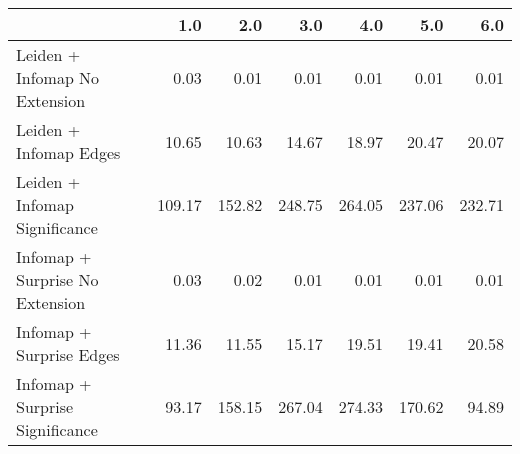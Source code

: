 \begin{tabular}{lrrrrrr}
\toprule
{} &    1.0 &    2.0 &    3.0 &    4.0 &    5.0 &    6.0 \\
\midrule
Leiden + Infomap No Extension   &   0.03 &   0.01 &   0.01 &   0.01 &   0.01 &   0.01 \\
Leiden + Infomap Edges          &  10.65 &  10.63 &  14.67 &  18.97 &  20.47 &  20.07 \\
Leiden + Infomap Significance   & 109.17 & 152.82 & 248.75 & 264.05 & 237.06 & 232.71 \\
Infomap + Surprise No Extension &   0.03 &   0.02 &   0.01 &   0.01 &   0.01 &   0.01 \\
Infomap + Surprise Edges        &  11.36 &  11.55 &  15.17 &  19.51 &  19.41 &  20.58 \\
Infomap + Surprise Significance &  93.17 & 158.15 & 267.04 & 274.33 & 170.62 &  94.89 \\
\bottomrule
\end{tabular}
